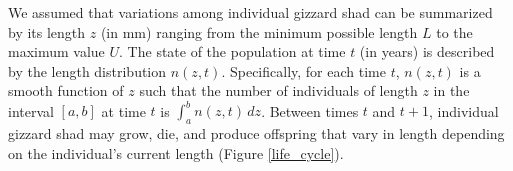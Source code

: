 \documentclass[preprint,review,12pt,authoryear]{elsarticle}
\def\ds{\displaystyle}
\begin{document}
We assumed that variations among individual gizzard shad can be summarized by its length $z$ (in mm) ranging from the minimum possible length $L$ to the maximum value $U$. 
The state of the population at time $t$ (in years) is described by the length distribution $n(z,t)$. 
Specifically, for each time $t$, $n(z,t)$ is a smooth function of $z$ such that the number of individuals of length $z$ in the interval $[a,b]$ at time $t$ is $\ds \int_a^b n(z,t) \, dz$. 
Between times $t$ and $t+1$, individual gizzard shad may grow, die, and produce offspring that vary in length depending on the individual's current length (Figure \ref{life_cycle}). 

\begin{figure}
    \begin{center}
\begin{tikzpicture}[->,>=stealth',shorten >=1pt,auto,node distance=3cm,
  thick,
  main node/.style={rectangle,draw},
  box/.style = {draw=gray, very thick,
                            minimum height=11mm, text width=11mm, 
                            align=center},]
                              

\end{tikzpicture}
\end{center}
\end{figure}
\end{document}
